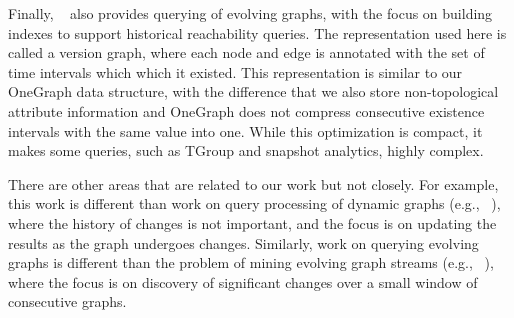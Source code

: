 Finally, ~\cite{Semertzidis2015} also provides querying of evolving
graphs, with the focus on building indexes to support historical
reachability queries.  The representation used here is called a
version graph, where each node and edge is annotated with the set of
time intervals which which it existed.  This representation is similar
to our OneGraph data structure, with the difference that we also store
non-topological attribute information and OneGraph does not compress
consecutive existence intervals with the same value into one.  While
this optimization is compact, it makes some queries, such as TGroup
and snapshot analytics, highly complex.

There are other areas that are related to our work but not closely.
For example, this work is different than work on query processing of
dynamic graphs (e.g., ~\cite{Mondal2012}), where the history of
changes is not important, and the focus is on updating the results as
the graph undergoes changes.  Similarly, work on querying evolving
graphs is different than the problem of mining evolving graph streams
(e.g., ~\cite{Liu2010}), where the focus is on discovery of
significant changes over a small window of consecutive graphs.

